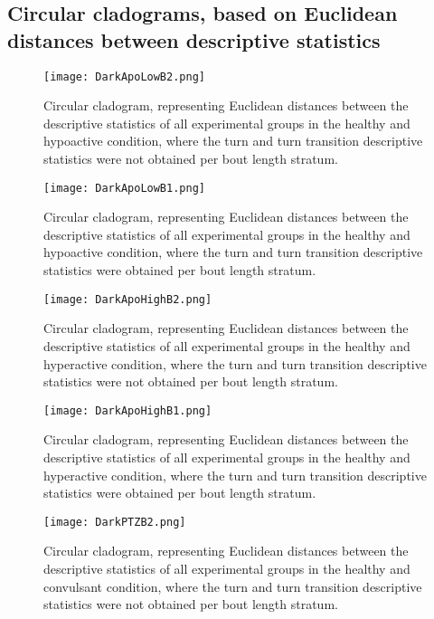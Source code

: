 \subsection{Circular cladograms, based on Euclidean distances between descriptive statistics}

\begin{figure}[h!]
\begin{center}
\texttt{[image: DarkApoLowB2.png]}
\caption{Circular cladogram, representing Euclidean distances between the descriptive statistics of all experimental groups in the healthy and hypoactive condition, where the turn and turn transition descriptive statistics were not obtained per bout length stratum.}
\end{center}
\end{figure}
\begin{figure}[h!]
\begin{center}
\texttt{[image: DarkApoLowB1.png]}
\caption{Circular cladogram, representing Euclidean distances between the descriptive statistics of all experimental groups in the healthy and hypoactive condition, where the turn and turn transition descriptive statistics were obtained per bout length stratum.}
\end{center}
\end{figure}
\newpage
\begin{figure}[h!]
\begin{center}
\texttt{[image: DarkApoHighB2.png]}
\caption{Circular cladogram, representing Euclidean distances between the descriptive statistics of all experimental groups in the healthy and hyperactive condition, where the turn and turn transition descriptive statistics were not obtained per bout length stratum.}
\end{center}
\end{figure}
\begin{figure}[h!]
\begin{center}
\texttt{[image: DarkApoHighB1.png]}
\caption{Circular cladogram, representing Euclidean distances between the descriptive statistics of all experimental groups in the healthy and hyperactive condition, where the turn and turn transition descriptive statistics were obtained per bout length stratum.}
\end{center}
\end{figure}
\newpage
\begin{figure}[h!]
\begin{center}
\texttt{[image: DarkPTZB2.png]}
\caption{Circular cladogram, representing Euclidean distances between the descriptive statistics of all experimental groups in the healthy and convulsant condition, where the turn and turn transition descriptive statistics were not obtained per bout length stratum.}
\end{center}
\end{figure}
